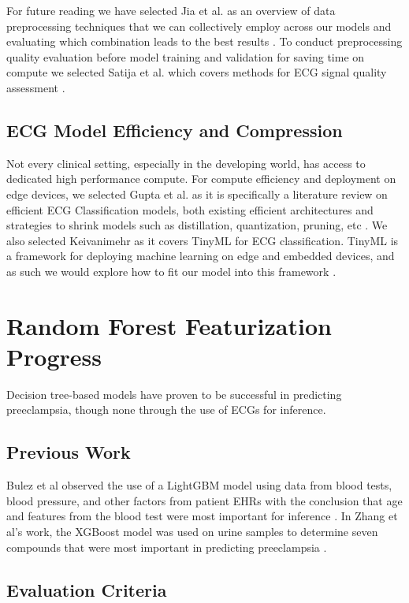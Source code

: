 \documentclass[sigconf,nonacm]{acmart}
\begin{document}
For future reading we have selected Jia et al. as an overview of data preprocessing techniques that we can collectively employ across our models and evaluating which combination leads to the best results \cite{jia_preprocessing_2024}. To conduct preprocessing quality evaluation before model training and validation for saving time on compute we selected Satija et al. which covers methods for ECG signal quality assessment \cite{satija_review_2018}.

\subsection{ECG Model Efficiency and Compression}

Not every clinical setting, especially in the developing world, has access to dedicated high performance compute. For compute efficiency and deployment on edge devices, we selected Gupta et al. as it is specifically a literature review on efficient ECG Classification models, both existing efficient architectures and strategies to shrink models such as distillation, quantization, pruning, etc \cite{gupta_comprehensive_2024}. We also selected Keivanimehr as it covers TinyML for ECG classification. TinyML is a framework for deploying machine learning on edge and embedded devices, and as such we would explore how to fit our model into this framework \cite{keivanimehr_tinyml_2025}.

\newpage
\section{Random Forest Featurization Progress}
Decision tree-based models have proven to be successful in predicting preeclampsia, though none through the use of ECGs for inference.
\subsection{Previous Work}

 Bulez et al observed the use of a LightGBM model using data from blood tests, blood pressure, and other factors from patient EHRs with the conclusion that age and features from the blood test were most important for inference \cite{bulez_artificial_2024}. In Zhang et al's work, the XGBoost model was used on urine samples to determine seven compounds that were most important in predicting preeclampsia \cite{zhang_development_2023}.

\subsection{Evaluation Criteria}
\end{document}
